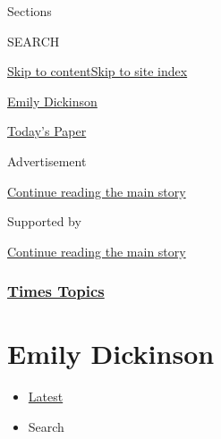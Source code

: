 Sections

SEARCH

\protect\hyperlink{site-content}{Skip to
content}\protect\hyperlink{site-index}{Skip to site index}

\href{https://www.nytimes3xbfgragh.onion/topic/person/emily-dickinson}{Emily
Dickinson}

\href{https://myaccount.nytimes3xbfgragh.onion/auth/login?response_type=cookie\&client_id=vi}{}

\href{https://www.nytimes3xbfgragh.onion/section/todayspaper}{Today's
Paper}

Advertisement

\protect\hyperlink{after-top}{Continue reading the main story}

Supported by

\protect\hyperlink{after-sponsor}{Continue reading the main story}

\hypertarget{times-topics}{%
\subsubsection{\texorpdfstring{\href{/index.html}{Times
Topics}}{Times Topics}}\label{times-topics}}

\hypertarget{emily-dickinson}{%
\section{Emily Dickinson}\label{emily-dickinson}}

\begin{itemize}
\tightlist
\item
  \protect\hyperlink{stream-panel}{Latest}
\item
  Search
\end{itemize}

